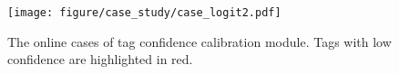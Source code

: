 

\begin{figure}[h]
  \centering
  \texttt{[image: figure/case\_study/case\_logit2.pdf]}
  \caption{The online cases of tag confidence calibration module. Tags with low confidence are highlighted in red.}
  \label{fig:case_logit}
\end{figure}

